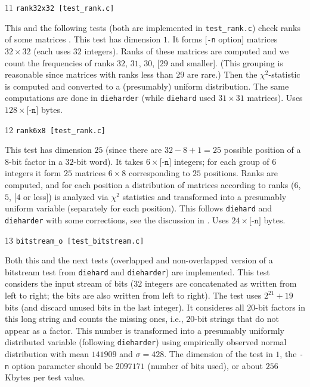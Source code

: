 \documentclass[12pt,a4paper,fullpage]{article}
\begin{document}
\begin{description}
\item{11} \texttt{rank32x32 [test\_rank.c]}

This and the following tests (both are implemented in \texttt{test\_rank.c}) check ranks of some matrices . This test has dimension $1$. It forms [\texttt{-n} option] matrices  $32\times 32$ (each uses $32$ integers). Ranks of these matrices are computed and we count the frequencies of ranks $32$, $31$, $30$, [$29$ and smaller]. (This grouping is reasonable since matrices with ranks less than $29$ are rare.) Then the $\chi^2$-statistic is computed and converted to a (presumably) uniform distribution. The same computations are done in  \texttt{dieharder} (while \texttt{diehard} used $31\times 31$ matrices). Uses $128\times\texttt{[-n]}$ bytes.

\item{12} \texttt{rank6x8 [test\_rank.c]}

This test has dimension $25$ (since there are $32-8+1=25$ possible position of a $8$-bit factor in a $32$-bit word). It takes $6\times\texttt{[-n]}$ integers; for each group of $6$ integers it form $25$ matrices $6\times 8$ corresponding to $25$ positions. Ranks are computed, and for each position a distribution of matrices according to ranks ($6$, $5$, [$4$ or less]) is analyzed via $\chi^2$ statistics and transformed into a presumably uniform variable (separately for each position). This follows \texttt{diehard} and \texttt{dieharder} with some corrections, see the discussion in \cite[Section 7.1]{shen-romashchenko-robust}. Uses $24\times\texttt{[-n]}$ bytes.

\item{13} \texttt{bitstream\_o [test\_bitstream.c]}

Both this and the next tests (overlapped and non-overlapped version of a bitstream test from \texttt{diehard} and \texttt{dieharder}) are implemented. This test considers the input stream of bits ($32$ integers are concatenated as written from left to right; the bits are also written from left to right). The test uses $2^{21}+19$ bits (and discard unused bits in the last integer). It consideres all $20$-bit factors in this long string and counts the missing ones, i.e., $20$-bit strings that do not appear as a factor. This number is transformed into a presumably uniformly distributed variable (following \texttt{dieharder}) using empirically observed normal distribution with mean  $141909$ and $\sigma=428$. The dimension of the test in $1$, the \texttt{-n} option parameter should be $2097171$ (number of bits used), or about $256$ Kbytes per test value.


\end{description}
\end{document}
